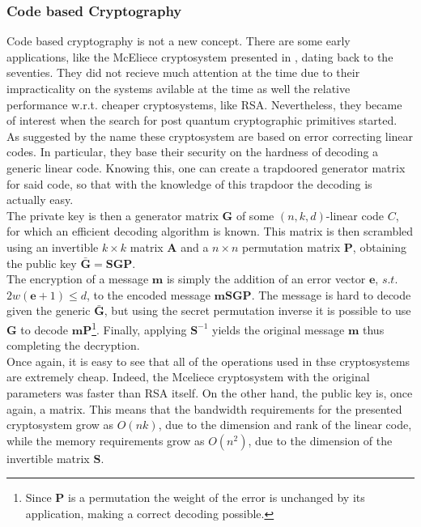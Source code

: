 \subsubsection{Code based Cryptography}
Code based cryptography is not a new concept. There are some early applications, like the McEliece cryptosystem presented in \cite{mceliece}, dating back to the seventies. They did not recieve much attention at the time due to their impracticality on the systems avilable at the time as well the relative performance w.r.t. cheaper cryptosystems, like RSA. Nevertheless, they became of interest when the search for post quantum cryptographic primitives started.\\
As suggested by the name these cryptosystem are based on error correcting linear codes. In particular, they base their security on the hardness of decoding a generic linear code. Knowing this, one can create a trapdoored generator matrix for said code, so that with the knowledge of this trapdoor the decoding is actually easy.\\
The private key is then a generator matrix $\mathbf{G}$ of some $(n,k,d)$-linear code $C$, for which an efficient decoding algorithm is known. This matrix is then scrambled using an invertible $k\times k$ matrix $\mathbf{A}$ and a $n\times n$ permutation matrix $\mathbf{P}$, obtaining the public key $\bar{\mathbf{G}}=\mathbf{SGP}$.\\
The encryption of a message $\mathbf{m}$ is simply the addition of an error vector $\mathbf{e}$, $s.t.$ $2w(\mathbf{e}+1)\leq d$, to the encoded message $\mathbf{mSGP}$. The message is hard to decode given the generic $\bar{\mathbf{G}}$, but using the secret permutation inverse it is possible to use $\mathbf{G}$ to decode $\mathbf{mP}$\footnote{Since $\mathbf{P}$ is a permutation the weight of the error is unchanged by its application, making a correct decoding possible.}. Finally, applying $\mathbf{S}^{-1}$ yields the original message $\mathbf{m}$ thus completing the decryption.\\
Once again, it is easy to see that all of the operations used in thse cryptosystems are extremely cheap. Indeed, the Mceliece cryptosystem with the original parameters was faster than RSA itself. On the other hand, the public key is, once again, a matrix. This means that the bandwidth requirements for the presented cryptosystem grow as $O(nk)$, due to the dimension and rank of the linear code, while the memory requirements grow as $O(n^2)$, due to the dimension of the invertible matrix $\mathbf{S}$.


